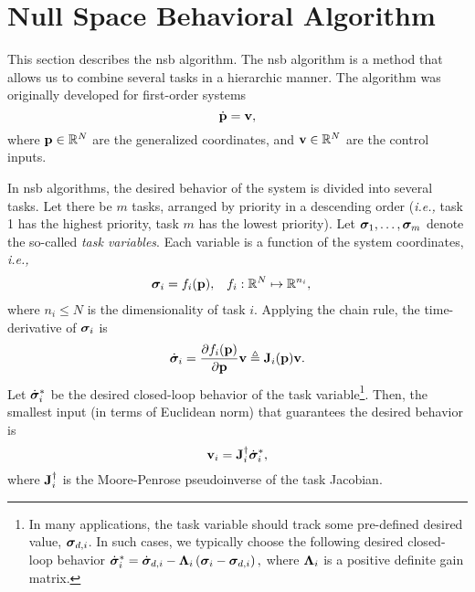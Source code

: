 \section{Null Space Behavioral Algorithm}
\label{sec:background_NSB}

This section describes the \acrlong{nsb} algorithm.
The \gls{nsb} algorithm is a method that allows us to combine several tasks in a hierarchic manner.
The algorithm was originally developed for first-order systems
\begin{equation}
    \dot{\mathbf{p}} = \mathbf{v},
\end{equation}
where $\mathbf{p} \in \mathbb{R}^N$ are the generalized coordinates, and $\mathbf{v} \in \mathbb{R}^N$ are the control inputs.

In \gls{nsb} algorithms, the desired behavior of the system is divided into several tasks.
Let there be $m$ tasks, arranged by priority in a descending order (\emph{i.e.,} task 1 has the highest priority, task $m$ has the lowest priority).
Let $\bm{\sigma}_1, \ldots, \bm{\sigma}_m$ denote the so-called \emph{task variables}.
Each variable is a function of the system coordinates, \emph{i.e.,}
\begin{align}
    \bm{\sigma}_i &= f_i(\mathbf{p}), &
    f_i &: \mathbb{R}^N \mapsto \mathbb{R}^{n_i},
\end{align}
where $n_i \leq N$ is the dimensionality of task $i$.
Applying the chain rule, the time-derivative of $\bm{\sigma}_i$ is
\begin{equation}
    \dot{\bm{\sigma}}_i = \frac{\partial f_i(\mathbf{p})}{\partial \mathbf{p}} \mathbf{v} \triangleq \mathbf{J}_i(\mathbf{p}) \mathbf{v}.
\end{equation}
Let $\dot{\bm{\sigma}}_i^{*}$ be the desired closed-loop behavior of the task variable\footnote{
In many applications, the task variable should track some pre-defined desired value, $\bm{\sigma}_{d, i}$.
In such cases, we typically choose the following desired closed-loop behavior
$
    \dot{\bm{\sigma}}_i^{*} = \dot{\bm{\sigma}}_{d, i} - \bm{\Lambda}_i \left(\bm{\sigma}_i - \bm{\sigma}_{d,i}\right),    
$
where $\bm{\Lambda}_i$ is a positive definite gain matrix.
}.
Then, the smallest input (in terms of Euclidean norm) that guarantees the desired behavior is
\begin{equation}
    \mathbf{v}_i = \mathbf{J}_i^{\dagger} \dot{\bm{\sigma}}_i^{*},
    \label{eq:background_NSB_velocity_i}
\end{equation}
where $\mathbf{J}_i^{\dagger}$ is the Moore-Penrose pseudoinverse of the task Jacobian.

